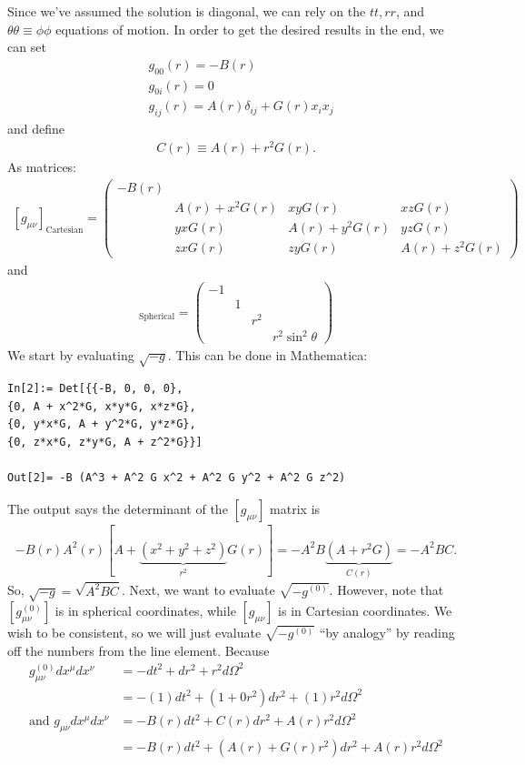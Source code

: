 \documentclass{book}
\theoremstyle{definition}
\newcommand{\nn}{\nonumber}
\newcommand{\lp}{\left(}
\newcommand{\rp}{\right)}
\newcommand{\lb}{\left[}
\newcommand{\rb}{\right]}
\begin{document}
Since we've assumed the solution is diagonal, we can rely on the $tt,rr$, and $\theta\theta \equiv \phi\phi$ equations of motion. In order to get the desired results in the end, we can set
\begin{align}
&g_{00}(r) = -B(r)\nn\\
&g_{0i}(r) = 0\nn\\
&g_{ij}(r) = A(r)\delta_{ij} + G(r)x_ix_j 
\end{align}
and define 
\begin{align}
C(r) \equiv A(r) + r^2 G(r).
\end{align}
As matrices:
\begin{align}
\boxed{[g_{\mu\nu}]_{\text{Cartesian}} = \begin{pmatrix}
-B(r) &&&\\
&A(r) + x^2G(r)&xyG(r)&xzG(r)\\
&yxG(r)&A(r)+ y^2G(r)&yzG(r)\\
&zxG(r)&zyG(r)&A(r)+ z^2G(r)
\end{pmatrix}}
\end{align}
and
\begin{align}
[g^{(0)}_{\mu\nu}]_{\text{Spherical}} = \begin{pmatrix}
-1 &&&\\
&1& & \\
&&r^2&\\
&&&r^2 \sin^2\theta \end{pmatrix}
\end{align}
We start by evaluating $\sqrt{-g}$. This can be done in Mathematica:
\begin{lstlisting}
In[2]:= Det[{{-B, 0, 0, 0},
{0, A + x^2*G, x*y*G, x*z*G},
{0, y*x*G, A + y^2*G, y*z*G},
{0, z*x*G, z*y*G, A + z^2*G}}]

Out[2]= -B (A^3 + A^2 G x^2 + A^2 G y^2 + A^2 G z^2)
\end{lstlisting}
The output says the determinant of the $[g_{\mu\nu}]$ matrix is 
\begin{align}
-B(r)A^2(r)\lb A + \underbrace{(x^2 + y^2 + z^2)}_{r^2}G(r) \rb = -A^2B\underbrace{(A+r^2G)}_{C(r)} = -A^2BC.  
\end{align}
So, ${\sqrt{-g} = \sqrt{A^2BC}}$.  Next, we want to evaluate $\sqrt{-g^{(0)}}$. However, note that $[g_{\mu\nu}^{(0)}]$ is in spherical coordinates, while $[g_{\mu\nu}]$ is in Cartesian coordinates. We wish to be consistent, so we will just evaluate $\sqrt{-g^{(0)}}$ ``by analogy'' by reading off the numbers from the line element. Because
\begin{align}
g^{(0)}_{\mu\nu}dx^\mu dx^\nu &= -dt^2 + dr^2 + r^2 d\Omega^2 \nn\\
&= -(1)dt^2 + \lp 1 + 0 r^2 \rp dr^2 + (1)r^2d\Omega^2\nn\\
\text{and }  g_{\mu\nu}dx^\mu dx^\nu &= -B(r)dt^2 + C(r)dr^2+ A(r)r^2d\Omega^2\nn\\
&= -B(r)dt^2 + \lp A(r) + G(r) r^2 \rp dr^2+ A(r)r^2d\Omega^2
\end{align}
\end{document}
